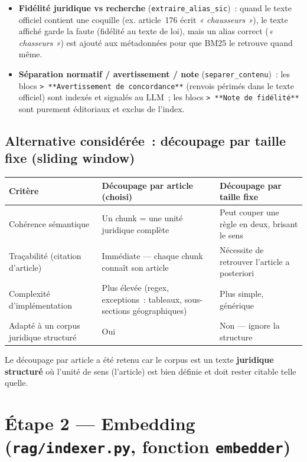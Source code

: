 \documentclass[11pt]{article}
\begin{document}
\begin{itemize}
  \item \textbf{Fidélité juridique vs recherche} (\texttt{extraire\_alias\_sic})~: quand le texte
        officiel contient une coquille (ex. article~176 écrit \textit{« chausseurs »}), le texte
        affiché garde la faute (fidélité au texte de loi), mais un alias correct
        (\textit{« chasseurs »}) est ajouté aux métadonnées pour que BM25 le retrouve quand même.

  \item \textbf{Séparation normatif / avertissement / note} (\texttt{separer\_contenu})~: les
        blocs \texttt{> **Avertissement de concordance**} (renvois périmés dans le texte officiel)
        sont indexés et signalés au LLM~; les blocs \texttt{> **Note de fidélité**} sont purement
        éditoriaux et exclus de l'index.
\end{itemize}

\subsection*{Alternative considérée~: découpage par taille fixe (sliding window)}

\begin{tabularx}{\textwidth}{@{}l Y Y@{}}
\toprule
\textbf{Critère} & \textbf{Découpage par article (choisi)} & \textbf{Découpage par taille fixe} \\
\midrule
Cohérence sémantique & Un chunk = une unité juridique complète & Peut couper une règle en deux, brisant le sens \\
Traçabilité (citation d'article) & Immédiate --- chaque chunk connaît son article & Nécessite de retrouver l'article a posteriori \\
Complexité d'implémentation & Plus élevée (regex, exceptions~: tableaux, sous-sections géographiques) & Plus simple, générique \\
Adapté à un corpus juridique structuré & Oui & Non --- ignore la structure \\
\bottomrule
\end{tabularx}

\vspace{0.5em}
Le découpage par article a été retenu car le corpus est un texte \textbf{juridique structuré} où
l'unité de sens (l'article) est bien définie et doit rester citable telle quelle.

\section{Étape 2 --- Embedding (\texttt{rag/indexer.py}, fonction \texttt{embedder})}
\end{document}
